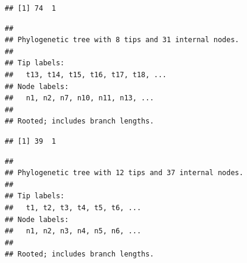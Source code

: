 \documentclass[
]{book}
\newenvironment{Shaded}{\begin{snugshade}}{\end{snugshade}}
\newcommand{\CommentTok}[1]{\textcolor[rgb]{0.56,0.35,0.01}{\textit{#1}}}
\newcommand{\DataTypeTok}[1]{\textcolor[rgb]{0.13,0.29,0.53}{#1}}
\newcommand{\KeywordTok}[1]{\textcolor[rgb]{0.13,0.29,0.53}{\textbf{#1}}}
\newcommand{\NormalTok}[1]{#1}
\newcommand{\OperatorTok}[1]{\textcolor[rgb]{0.81,0.36,0.00}{\textbf{#1}}}
\newcommand{\StringTok}[1]{\textcolor[rgb]{0.31,0.60,0.02}{#1}}
\begin{document}
\begin{verbatim}
## [1] 74  1
\end{verbatim}

\begin{Shaded}
\end{Shaded}

\begin{verbatim}
## 
## Phylogenetic tree with 8 tips and 31 internal nodes.
## 
## Tip labels:
##   t13, t14, t15, t16, t17, t18, ...
## Node labels:
##   n1, n2, n7, n10, n11, n13, ...
## 
## Rooted; includes branch lengths.
\end{verbatim}

\begin{Shaded}
\end{Shaded}

\begin{verbatim}
## [1] 39  1
\end{verbatim}

\begin{Shaded}
\end{Shaded}

\begin{verbatim}
## 
## Phylogenetic tree with 12 tips and 37 internal nodes.
## 
## Tip labels:
##   t1, t2, t3, t4, t5, t6, ...
## Node labels:
##   n1, n2, n3, n4, n5, n6, ...
## 
## Rooted; includes branch lengths.
\end{verbatim}

\begin{Shaded}
\end{Shaded}
\end{document}
